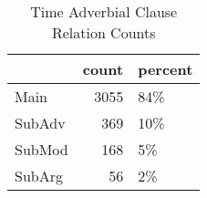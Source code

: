 \begin{table}[htbp!]
\centering
\caption{Time Adverbial Clause Relation Counts}
\label{table:rel_both}
\begin{tabular}{lrl}
\toprule
{} &  count & percent \\
\midrule
Main   &   3055 &     84\% \\
SubAdv &    369 &     10\% \\
SubMod &    168 &      5\% \\
SubArg &     56 &      2\% \\
\bottomrule
\end{tabular}
\end{table}
